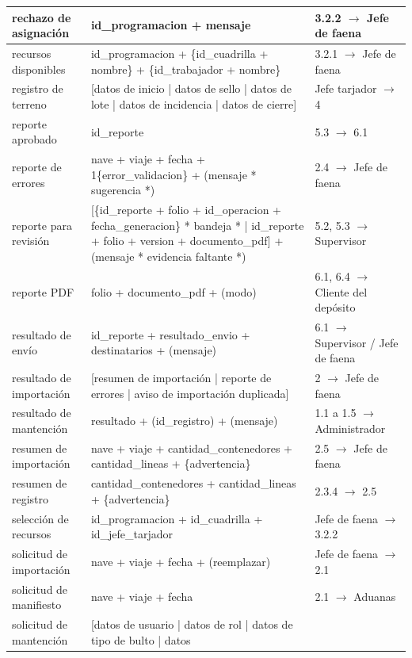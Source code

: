 {\begin{longtable}{|L{3.4cm}|L{7.2cm}|L{4.0cm}|}
rechazo de asignación & id\_programacion + mensaje & 3.2.2 $\rightarrow$ Jefe de faena \\
\hline
recursos disponibles & id\_programacion + \{id\_cuadrilla + nombre\} + \{id\_trabajador +
nombre\} & 3.2.1 $\rightarrow$ Jefe de faena \\ \hline
registro de terreno & [datos de inicio | datos de sello | datos de lote | datos de incidencia
| datos de cierre] & Jefe tarjador $\rightarrow$ 4 \\ \hline
reporte aprobado & id\_reporte & 5.3 $\rightarrow$ 6.1 \\ \hline
reporte de errores & nave + viaje + fecha + 1\{error\_validacion\} + (mensaje * sugerencia
*) & 2.4 $\rightarrow$ Jefe de faena \\ \hline
reporte para revisión & [\{id\_reporte + folio + id\_operacion + fecha\_generacion\} *
bandeja * | id\_reporte + folio + version + documento\_pdf] + (mensaje * evidencia faltante
*) & 5.2, 5.3 $\rightarrow$ Supervisor \\ \hline
reporte PDF & folio + documento\_pdf + (modo) & 6.1, 6.4 $\rightarrow$ Cliente del depósito
\\ \hline
resultado de envío & id\_reporte + resultado\_envio + destinatarios + (mensaje) & 6.1
$\rightarrow$ Supervisor / Jefe de faena \\ \hline
resultado de importación & [resumen de importación | reporte de errores | aviso de
importación duplicada] & 2 $\rightarrow$ Jefe de faena \\ \hline
resultado de mantención & resultado + (id\_registro) + (mensaje) & 1.1 a 1.5 $\rightarrow$
Administrador \\ \hline
resumen de importación & nave + viaje + cantidad\_contenedores + cantidad\_lineas +
\{advertencia\} & 2.5 $\rightarrow$ Jefe de faena \\ \hline
resumen de registro & cantidad\_contenedores + cantidad\_lineas + \{advertencia\} & 2.3.4
$\rightarrow$ 2.5 \\ \hline
selección de recursos & id\_programacion + id\_cuadrilla + id\_jefe\_tarjador & Jefe de faena
$\rightarrow$ 3.2.2 \\ \hline
solicitud de importación & nave + viaje + fecha + (reemplazar) & Jefe de faena
$\rightarrow$ 2.1 \\ \hline
solicitud de manifiesto & nave + viaje + fecha & 2.1 $\rightarrow$ Aduanas \\ \hline
solicitud de mantención & [datos de usuario | datos de rol | datos de tipo de bulto | datos

\end{longtable}}

